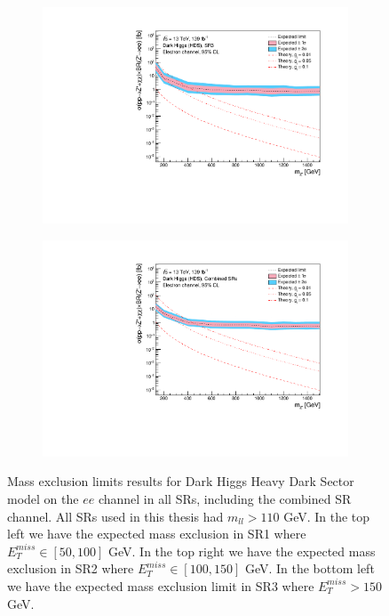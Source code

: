 \documentclass[12pt, a4paper]{book}
\begin{document}
\begin{figure}[!ht]
\begin{subfigure}[b]{0.49\textwidth}
      \includegraphics[width=1\textwidth]{Limits/Model_independent/150/DH_HDS/mass_exclusion_ee.pdf}
   \end{subfigure}
   \hfil
   \begin{subfigure}[b]{0.49\textwidth}
      \centering
      \includegraphics[width=1\textwidth]{Limits/Model_independent/DH_HDS/mass_exclusion_ee.pdf}
   \end{subfigure}
   \caption[Electron channel mass exclusions in DH HDS using the model independent approach]{Mass exclusion limits results for Dark Higgs Heavy Dark Sector model on the $ee$ channel in all SRs, including the combined SR channel. All SRs used in this thesis had $m_{ll}>110$ GeV.
   In the top left we have the expected mass exclusion in SR1 where $E_T^{miss} \in [50, 100]$ GeV. In the top right we have the expected mass exclusion in SR2 where $E_T^{miss} \in [100, 150]$ GeV. In the bottom left we have the expected mass exclusion limit in SR3 where $E_T^{miss} >150$ GeV. 
}
\end{figure}
\end{document}
